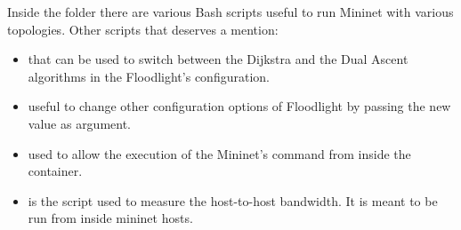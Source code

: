 Inside the  folder there are various Bash scripts useful to run
Mininet with various topologies. Other scripts that deserves a mention:
\begin{itemize}
	\item {} that can be used to switch
		between the Dijkstra and the Dual Ascent algorithms in the
		Floodlight's configuration.
	\item {} useful to change other configuration
		options of Floodlight by passing the new value as argument.
	\item {} used to allow the execution of the
		Mininet's  command from inside the container.
	\item {} is the script used to measure the
		host-to-host bandwidth. It is meant to be run from inside
		mininet hosts.
\end{itemize}


